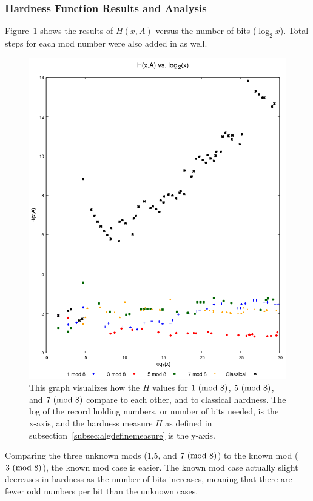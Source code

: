 \subsubsection{Hardness Function Results and Analysis} \label{subsubsec:algsinhardness}
Figure~\ref{fig:hvslog} shows the results of $H(x,A)$ versus the number of bits ($\log_2{x}$). Total steps for each mod number were also added in as well.\par
\begin{figure}
    \centering
    \includegraphics[scale=0.75]{ModAvoidanceAnalysisPics/H_vs_log.png}
    \caption{This graph visualizes how the $H$ values for $1 \ (\mathrm{mod}\ 8)$, $5 \ (\mathrm{mod}\ 8)$, and $7 \ (\mathrm{mod}\ 8)$ compare to each other, and to classical hardness. The log of the record holding numbers, or number of bits needed, is the x-axis, and the hardness measure $H$ as defined in subsection~\ref{subsec:algdefinemeasure} is the y-axis.}
    \label{fig:hvslog}
\end{figure}
Comparing the three unknown mods (1,5, and $7 \ (\mathrm{mod}\ 8)$) to the known mod ($3 \ (\mathrm{mod}\ 8)$), the known mod case is easier. The known mod case actually slight decreases in hardness as the number of bits increases, meaning that there are fewer odd numbers per bit than the unknown cases. \par
